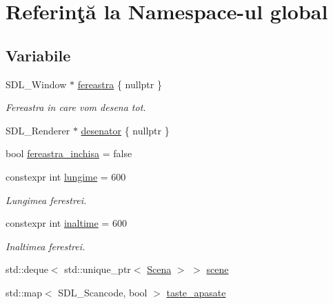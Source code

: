 \hypertarget{namespaceglobal}{}\section{Referinţă la Namespace-\/ul global}
\label{namespaceglobal}
\subsection*{Variabile}
\begin{DoxyCompactItemize}
\item 
\mbox{\label{namespaceglobal_a07963dc89966c80411e6a3c896c07c10}} 
S\+D\+L\+\_\+\+Window $\ast$ \hyperlink{namespaceglobal_a07963dc89966c80411e6a3c896c07c10}{fereastra} \{ nullptr \}
\begin{DoxyCompactList}\small\item\em Fereastra in care vom desena tot. \end{DoxyCompactList}\item 
S\+D\+L\+\_\+\+Renderer $\ast$ \hyperlink{namespaceglobal_ae80ab1c7d78e562614d35c3b78e44ea3}{desenator} \{ nullptr \}
\item 
bool \hyperlink{namespaceglobal_a930b1255fa49cd41dc635136822d56ee}{fereastra\+\_\+inchisa} = false
\item 
\mbox{\label{namespaceglobal_a5ad71f80dc82eb6fd1036c8055a5dfbc}} 
constexpr int \hyperlink{namespaceglobal_a5ad71f80dc82eb6fd1036c8055a5dfbc}{lungime} = 600
\begin{DoxyCompactList}\small\item\em Lungimea ferestrei. \end{DoxyCompactList}\item 
\mbox{\label{namespaceglobal_a612e7b296f148c02400618f1770f57f7}} 
constexpr int \hyperlink{namespaceglobal_a612e7b296f148c02400618f1770f57f7}{inaltime} = 600
\begin{DoxyCompactList}\small\item\em Inaltimea ferestrei. \end{DoxyCompactList}\item 
std\+::deque$<$ std\+::unique\+\_\+ptr$<$ \hyperlink{classScena}{Scena} $>$ $>$ \hyperlink{namespaceglobal_af4564594d950b73d4bb81b8c0a4fe029}{scene}
\item 
std\+::map$<$ S\+D\+L\+\_\+\+Scancode, bool $>$ \hyperlink{namespaceglobal_a6da5c1308adb9fdac1c61389b139dc54}{taste\+\_\+apasate}
\end{DoxyCompactItemize}


